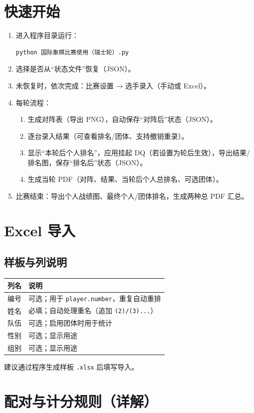 \documentclass[12pt]{ctexart}
\begin{document}
\section{快速开始}
\begin{enumerate}[leftmargin=1.6em]
  \item 进入程序目录运行：
\begin{lstlisting}[language=bash]
python 国际象棋比赛使用（瑞士轮）.py
\end{lstlisting}
  \item 选择是否从“状态文件”恢复（JSON）。
  \item 未恢复时，依次完成：比赛设置 → 选手录入（手动或 Excel）。
  \item 每轮流程：
  \begin{enumerate}
    \item 生成对阵表（导出 PNG），自动保存“对阵后”状态（JSON）。
    \item 逐台录入结果（可查看排名/团体、支持撤销重录）。
    \item 显示“本轮后个人排名”，应用挂起 DQ（若设置为轮后生效），导出结果/排名图，保存“排名后”状态（JSON）。
    \item 生成当轮 PDF（对阵、结果、当轮后个人总排名、可选团体）。
  \end{enumerate}
  \item 比赛结束：导出个人战绩图、最终个人/团体排名，生成两种总 PDF 汇总。
\end{enumerate}

\section{Excel 导入}
\subsection*{样板与列说明}
\begin{longtable}{p{3cm}p{11cm}}
\toprule
列名 & 说明 \\
\midrule
编号 & 可选；用于 \texttt{player.number}，重复自动重排 \\
姓名 & 必填；自动处理重名（追加 \texttt{(2)/(3)...}） \\
队伍 & 可选；启用团体时用于统计 \\
性别 & 可选；显示用途 \\
组别 & 可选；显示用途 \\
\bottomrule
\end{longtable}
建议通过程序生成样板 \texttt{.xlsx} 后填写导入。

\section{配对与计分规则（详解）}
\end{document}
